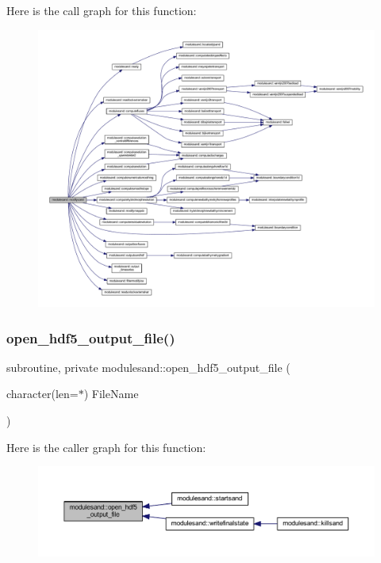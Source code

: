 Here is the call graph for this function\+:\nopagebreak
\begin{figure}[H]
\begin{center}
\leavevmode
\includegraphics[width=350pt]{namespacemodulesand_a72127773a460332746476a09b3380e49_cgraph}
\end{center}
\end{figure}
\mbox{\label{namespacemodulesand_a508ae0cf41ca1a4046aa378241b38e19}} 
\subsubsection{\texorpdfstring{open\+\_\+hdf5\+\_\+output\+\_\+file()}{open\_hdf5\_output\_file()}}
{\footnotesize\ttfamily subroutine, private modulesand\+::open\+\_\+hdf5\+\_\+output\+\_\+file (\begin{DoxyParamCaption}\item[{character(len=$\ast$)}]{File\+Name }\end{DoxyParamCaption})\hspace{0.3cm}{\ttfamily [private]}}

Here is the caller graph for this function\+:\nopagebreak
\begin{figure}[H]
\begin{center}
\leavevmode
\includegraphics[width=350pt]{namespacemodulesand_a508ae0cf41ca1a4046aa378241b38e19_icgraph}
\end{center}
\end{figure}
\mbox{\label{namespacemodulesand_a88edcbeb020c6e5308ed19af4b7d4d46}} 
